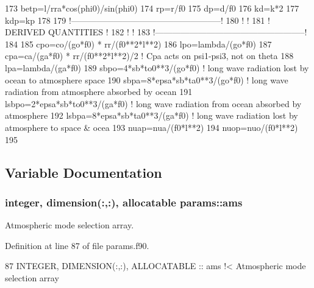 \begin{DoxyCode}
173     betp=l/rra*cos(phi0)/sin(phi0)
174     rp=r/f0
175     dp=d/f0
176     kd=k*2
177     kdp=kp
178 
179     \textcolor{comment}{!-----------------------------------------------------!}
180     \textcolor{comment}{!                                                     !}
181     \textcolor{comment}{! DERIVED QUANTITIES                                  !}
182     \textcolor{comment}{!                                                     !}
183     \textcolor{comment}{!-----------------------------------------------------!}
184 
185     cpo=co/(go*f0) * rr/(f0**2*l**2)
186     lpo=lambda/(go*f0)
187     cpa=ca/(ga*f0) * rr/(f0**2*l**2)/2 \textcolor{comment}{! Cpa acts on psi1-psi3, not on theta}
188     lpa=lambda/(ga*f0)
189     sbpo=4*sb*to0**3/(go*f0) \textcolor{comment}{! long wave radiation lost by ocean to atmosphere space}
190     sbpa=8*epsa*sb*ta0**3/(go*f0) \textcolor{comment}{! long wave radiation from atmosphere absorbed by ocean}
191     lsbpo=2*epsa*sb*to0**3/(ga*f0) \textcolor{comment}{! long wave radiation from ocean absorbed by atmosphere}
192     lsbpa=8*epsa*sb*ta0**3/(ga*f0) \textcolor{comment}{! long wave radiation lost by atmosphere to space & ocea}
193     nuap=nua/(f0*l**2)
194     nuop=nuo/(f0*l**2)
195 
\end{DoxyCode}


\subsection{Variable Documentation}
\subsubsection[{\texorpdfstring{ams}{ams}}]{\setlength{\rightskip}{0pt plus 5cm}integer, dimension(\+:,\+:), allocatable params\+::ams}\hypertarget{namespaceparams_aa95299f1a9c54693b85e049004369089}{}\label{namespaceparams_aa95299f1a9c54693b85e049004369089}


Atmospheric mode selection array. 



Definition at line 87 of file params.\+f90.


\begin{DoxyCode}
87   \textcolor{keywordtype}{INTEGER}, \textcolor{keywordtype}{DIMENSION(:,:)}, \textcolor{keywordtype}{ALLOCATABLE} :: ams\textcolor{comment}{   !< Atmospheric mode selection array}
\end{DoxyCode}
